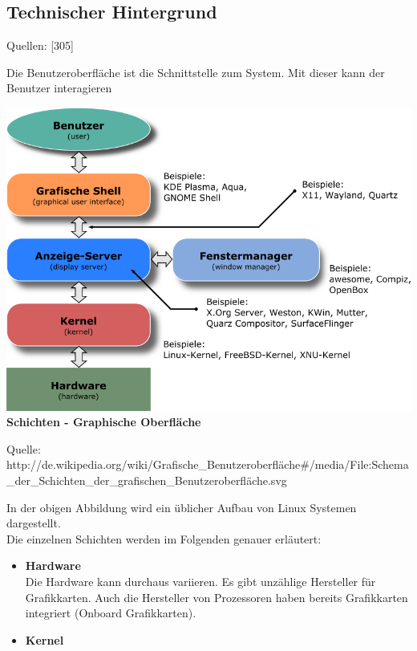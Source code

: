 \documentclass[12pt,a4paper]{report}
\begin{document}
\begin{onehalfspace}
\subsection{Technischer Hintergrund}
\begin{flushright}
\begin{tiny}
Quellen: [305]
\end{tiny}
\end{flushright}
Die Benutzeroberfläche ist die Schnittstelle zum System. Mit dieser kann der Benutzer interagieren
\begin{center}
\includegraphics[scale=0.7]{../docs/lyaton/graphics/Graph.png}\\
\textbf{Schichten - Graphische Oberfläche}\\
\begin{scriptsize}
Quelle: http://de.wikipedia.org/wiki/Grafische\_Benutzeroberfläche\#/media/File:Schema\_der\_Schichten\_der\_grafischen\_Benutzeroberfläche.svg
\end{scriptsize}
\end{center}
In der obigen Abbildung wird ein üblicher Aufbau von Linux Systemen dargestellt.\\
Die einzelnen Schichten werden im Folgenden genauer erläutert: \\
\begin{itemize}
\item \textbf{Hardware}\\
Die Hardware kann durchaus variieren. Es gibt unzählige Hersteller für Grafikkarten. Auch die Hersteller von Prozessoren haben bereits Grafikkarten integriert (Onboard Grafikkarten). 
\item \textbf{Kernel}\\

\end{itemize}
\end{onehalfspace}
\end{document}
